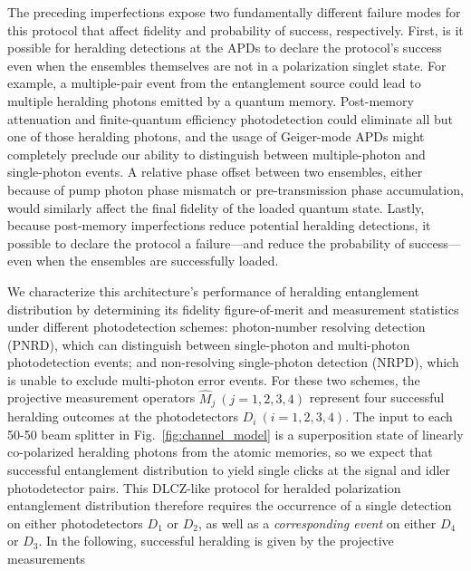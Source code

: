 \documentclass[aps,twocolumn,secnumarabic,amsmath,amssymb,pra,groupedaddress,
showpacs, showkeys,draft]{revtex4-1}
\newcommand{\pna}[1]{\left(#1\right)}
\begin{document}
The preceding imperfections expose two fundamentally different failure modes
for this protocol that affect fidelity and probability of success,
respectively. First, is it possible for heralding detections at the APDs to
declare the protocol's success even when the ensembles themselves are not in a
polarization singlet state. For example, a multiple-pair event from the
entanglement source could lead to multiple heralding photons emitted by a
quantum memory. Post-memory attenuation and finite-quantum efficiency
photodetection could eliminate all but one of those heralding photons, and the
usage of Geiger-mode APDs might completely preclude our ability to distinguish
between multiple-photon and single-photon events. A relative phase offset
between two ensembles, either because of pump photon phase mismatch or
pre-transmission phase accumulation, would similarly affect the final fidelity
of the loaded quantum state. Lastly, because post-memory imperfections reduce
potential heralding detections, it possible to declare the protocol a
failure---and reduce the probability of success---even when the ensembles are
successfully loaded.

We characterize this architecture's performance of heralding entanglement
distribution by determining its fidelity figure-of-merit and measurement
statistics under different photodetection schemes: photon-number resolving
detection (PNRD), which can distinguish between single-photon and multi-photon
photodetection events; and non-resolving single-photon detection (NRPD), which
is unable to exclude multi-photon error events. For these two schemes, the
projective measurement operators $\hat{M}_j~\pna{j=1,2,3,4}$ represent four
successful heralding outcomes at the photodetectors $D_i~\pna{i=1,2,3,4}$. The
input to each 50-50 beam splitter in Fig.~\ref{fig:channel_model} is a
superposition state of linearly co-polarized heralding photons from the atomic
memories, so we expect that successful entanglement distribution to yield
single clicks at the signal and idler photodetector pairs. This DLCZ-like
protocol for heralded polarization entanglement distribution therefore requires
the occurrence of a single detection on either photodetectors $D_1$ or $D_2$,
as well as a \emph{corresponding event} on either $D_4$ or $D_3$. In the
following, successful heralding is given by the projective measurements
\end{document}
